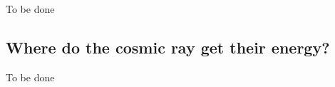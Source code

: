 {\color{red}To be done}

\subsection{Where do the cosmic ray get their energy?}

{\color{red}To be done}




